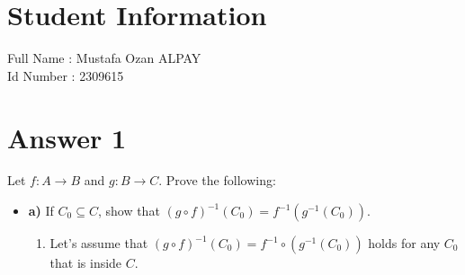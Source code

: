 \documentclass[12pt]{article}
\begin{document}
\section*{Student Information } 
Full Name : Mustafa Ozan ALPAY \\
Id Number : 2309615 \\

\section*{Answer 1}
Let $f: A \rightarrow B$ and $g: B \rightarrow C$. Prove the following: 
\begin{itemize}
\item \textbf{a)} If $C_0 \subseteq C$, show that $(g \circ f)^{-1} (C_0) = f^{-1}(g^{-1}(C_0))$.
\begin{enumerate}
\item Let's assume that $(g \circ f)^{-1}(C_0) = f^{-1} \circ (g^{-1} (C_0))$ holds for any $C_0$ that is inside $C$. 



\end{enumerate}
\end{itemize}
\end{document}
